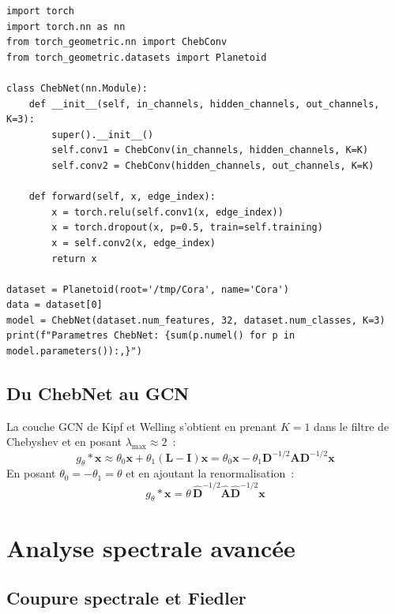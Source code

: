 \begin{codeblock}[title=\textbf{Impl\'ementation ChebNet}]
\begin{verbatim}
import torch
import torch.nn as nn
from torch_geometric.nn import ChebConv
from torch_geometric.datasets import Planetoid

class ChebNet(nn.Module):
    def __init__(self, in_channels, hidden_channels, out_channels, K=3):
        super().__init__()
        self.conv1 = ChebConv(in_channels, hidden_channels, K=K)
        self.conv2 = ChebConv(hidden_channels, out_channels, K=K)

    def forward(self, x, edge_index):
        x = torch.relu(self.conv1(x, edge_index))
        x = torch.dropout(x, p=0.5, train=self.training)
        x = self.conv2(x, edge_index)
        return x

dataset = Planetoid(root='/tmp/Cora', name='Cora')
data = dataset[0]
model = ChebNet(dataset.num_features, 32, dataset.num_classes, K=3)
print(f"Parametres ChebNet: {sum(p.numel() for p in model.parameters()):,}")
\end{verbatim}
\end{codeblock}

\subsection{Du ChebNet au GCN}

\begin{proposition}
La couche GCN de Kipf et Welling s'obtient en prenant $K = 1$ dans le filtre
de Chebyshev et en posant $\lambda_{\max} \approx 2$~:
\[
    g_\theta * \mathbf{x} \approx \theta_0 \mathbf{x} + \theta_1
    (\mathbf{L} - \mathbf{I})\mathbf{x}
    = \theta_0 \mathbf{x} - \theta_1 \mathbf{D}^{-1/2}\mathbf{A}\mathbf{D}^{-1/2}\mathbf{x}
\]
En posant $\theta_0 = -\theta_1 = \theta$ et en ajoutant la renormalisation~:
\[
    g_\theta * \mathbf{x} = \theta\,\hat{\mathbf{D}}^{-1/2}\hat{\mathbf{A}}
    \hat{\mathbf{D}}^{-1/2}\mathbf{x}
\]
\end{proposition}

\section{Analyse spectrale avanc\'ee}

\subsection{Coupure spectrale et Fiedler}

